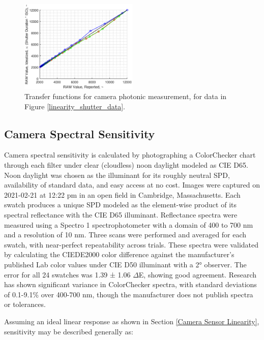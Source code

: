 \documentclass[twocolumn,10pt]{asme2ej}
\newcommand{\id}{\hspace{6 mm}}
\begin{document}
\begin{figure}
\centering
\includegraphics[width=0.5\textwidth]{linearity_shutter_curves.eps}
\caption{Transfer functions for camera photonic measurement, for data in Figure \ref{linearity_shutter_data}.}
\label{linearity_shutter_curves}
\end{figure}

\subsection{Camera Spectral Sensitivity}
\label{Camera_Spectral_Sensitivity}

Camera spectral sensitivity is calculated by photographing a ColorChecker chart through each filter under clear (cloudless) noon daylight modeled as CIE D65. Noon daylight was chosen as the illuminant for its roughly neutral SPD, availability of standard data, and easy access at no cost. Images were captured on 2021-02-21 at 12:22 pm in an open field in Cambridge, Massachusetts. Each swatch produces a unique SPD modeled as the element-wise product of its spectral reflectance with the CIE D65 illuminant. \cite{CVRL} Reflectance spectra were measured using a Spectro 1 spectrophotometer with a domain of 400 to 700 nm and a resolution of 10 nm. Three scans were performed and averaged for each swatch, with near-perfect repeatability across trials. These spectra were validated by calculating the CIEDE2000 color difference against the manufacturer's published Lab color values under CIE D50 illuminant with a 2° observer. \cite{X-Rite} The error for all 24 swatches was 1.39 ± 1.06 $\Delta$E, showing good agreement. Research has shown significant variance in ColorChecker spectra, with standard deviations of 0.1-9.1\% over 400-700 nm, though the manufacturer does not publish spectra or tolerances. \cite{BabelColor}

\id Assuming an ideal linear response as shown in Section \ref{Camera Sensor Linearity}, sensitivity may be described generally as:\\
\end{document}
